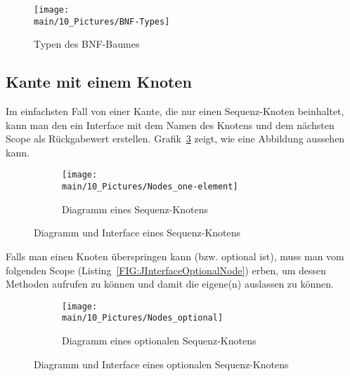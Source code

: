 \documentclass[../InterneDSLs.tex]{subfiles}
\begin{document}
\begin{figure}[ht]
\centering
\texttt{[image: \\main/10\_Pictures/BNF-Types]}
\caption{Typen des BNF-Baumes}
\label{FIG:TypesBNF}
\end{figure}

\begin{figure}[ht]

\end{figure}

\subsection{Kante mit einem Knoten}
Im einfachsten Fall von einer Kante, die nur einen Sequenz-Knoten beinhaltet, kann man den ein Interface mit dem Namen des Knotens und dem nächsten Scope als Rückgabewert erstellen. Grafik~\ref{FIG:OneElementNode} zeigt, wie eine Abbildung aussehen kann.
\begin{figure}[ht]
\centering
  \begin{subfigure}[c]{0.49\textwidth}
    \texttt{[image: \\main/10\_Pictures/Nodes\_one-element]}
    \caption{Diagramm eines Sequenz-Knotens}
    \label{FIG:DiagramOneElementNode}
  \end{subfigure}
  \begin{subfigure}[c]{0.49\textwidth}
    
  \end{subfigure}
  \caption{Diagramm und Interface eines Sequenz-Knotens}
  \label{FIG:OneElementNode}
\end{figure}

Falls man einen Knoten überspringen kann (bzw. optional ist), muss man vom folgenden Scope (Listing~\ref{FIG:JInterfaceOptionalNode}) erben, um dessen Methoden aufrufen zu können und damit die eigene(n) auslassen zu können.
\begin{figure}[ht]
\centering
  \begin{subfigure}[c]{0.49\textwidth}
    \texttt{[image: \\main/10\_Pictures/Nodes\_optional]}
    \caption{Diagramm eines optionalen Sequenz-Knotens}
    \label{FIG:DiagramOptionalNode}
  \end{subfigure}
  \begin{subfigure}[c]{0.49\textwidth}
    
  \end{subfigure}
  \caption{Diagramm und Interface eines optionalen Sequenz-Knotens}
  \label{FIG:OptionalNode}
\end{figure}
\end{document}
